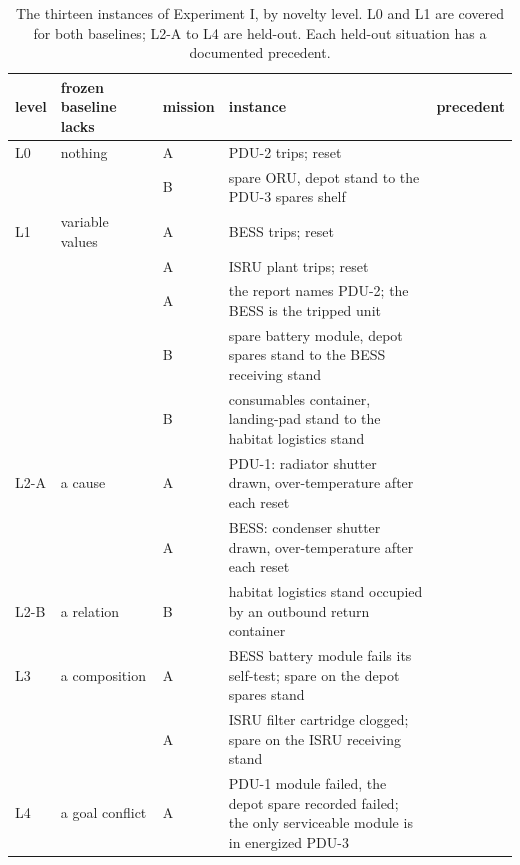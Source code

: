 \begin{table}[t]
  \centering
  \caption{The thirteen instances of Experiment I, by novelty level. L0 and L1 are covered for both baselines; L2-A to
  L4 are held-out. Each held-out situation has a documented precedent.}
  \label{tab:instances}
  \small
  \begin{tabular}{lllp{}l}
    \toprule
    level & frozen baseline lacks & mission & instance & precedent \\
    \midrule
    L0 & nothing & A & PDU-2 trips; reset & \citep{lewis2022uncrewed} \\
       &         & B & spare ORU, depot stand to the PDU-3 spares shelf & \citep{lewis2022uncrewed} \\
    L1 & variable values & A & BESS trips; reset & \citep{lewis2022uncrewed} \\
       &                 & A & ISRU plant trips; reset & \citep{lewis2022uncrewed} \\
       &                 & A & the report names PDU-2; the BESS is the tripped unit & \citep{nasa2015issdsr} \\
       &                 & B & spare battery module, depot spares stand to the BESS receiving stand & \citep{lewis2022uncrewed} \\
       &                 & B & consumables container, landing-pad stand to the habitat logistics stand & \citep{lewis2022uncrewed} \\
    L2-A & a cause & A & PDU-1: radiator shutter drawn, over-temperature after each reset & \citep{gaier2005apollo,nasa1971apollo15} \\
         &         & A & BESS: condenser shutter drawn, over-temperature after each reset & \citep{gaier2005apollo,nasa1971apollo15} \\
    L2-B & a relation & B & habitat logistics stand occupied by an outbound return container & \citep{nasa2019issdsr0617} \\
    L3 & a composition & A & BESS battery module fails its self-test; spare on the depot spares stand & \citep{dextre2011rpcm,nasa2019issdsr0402} \\
       &               & A & ISRU filter cartridge clogged; spare on the ISRU receiving stand & \citep{ogs2011filters} \\
    L4 & a goal conflict & A & PDU-1 module failed, the depot spare recorded failed; the only serviceable module is in energized PDU-3 & \citep{cfr1214403,gao1988cannibalization} \\
    \bottomrule
  \end{tabular}
\end{table}


